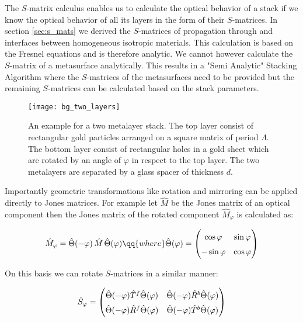 The $S$-matrix calculus enables us to calculate the optical behavior of a stack if we know the optical behavior of all its layers in the form of their $S$-matrices. In section \ref{sec:s_mats} we derived the $S$-matrices of propagation through and interfaces between homogeneous isotropic materials. This calculation is based on the Fresnel equations and is therefore analytic. We cannot however calculate the $S$-matrix of a metasurface analytically. This results in a "Semi Analytic" Stacking Algorithm where the $S$-matrices of the metasurfaces need to be provided but the remaining $S$-matrices can be calculated based on the stack parameters.

\begin{figure}[H]
    \centering
    \texttt{[image: bg\_two\_layers]}
    \caption{An example for a two metalayer stack. The top layer consist of rectangular gold particles arranged on a square matrix of period $\Lambda$. The bottom layer consist of rectangular holes in a gold sheet which are rotated by an angle of $\varphi$ in respect to the top layer. The two metalayers are separated by a glass spacer of thickness $d$.}
    \label{fig:bg:two_layers}
\end{figure}

Importantly geometric transformations like rotation and mirroring can be applied directly to Jones matrices. For example let $\hat M$ be the Jones matrix of an optical component then the Jones matrix of the rotated component $\hat{M}_{\varphi}$ is calculated as:

\begin{equation}
    \hat{M}_{\varphi} = \hat \Theta(-\varphi) \, \hat{M} \, \hat \Theta(\varphi)
    \qq{where}
    \hat \Theta(\varphi) =
    \begin{pmatrix}
        \cos \varphi & \sin \varphi \\
        -\sin \varphi & \cos \varphi
    \end{pmatrix}
\end{equation}

On this basis we can rotate $S$-matrices in a similar manner:

\begin{equation}
    \hat S_\varphi =
    \begingroup
    \renewcommand*{\arraystretch}{1.5}
        \begin{pmatrix}
            \hat \Theta(-\varphi) \hat T^f \hat \Theta(\varphi)&
            \hat \Theta(-\varphi) \hat R^b \hat \Theta(\varphi)\\
            \hat \Theta(-\varphi) \hat R^f \hat \Theta(\varphi)&
            \hat \Theta(-\varphi) \hat T^b \hat \Theta(\varphi)
        \end{pmatrix}
    \endgroup
\end{equation}

